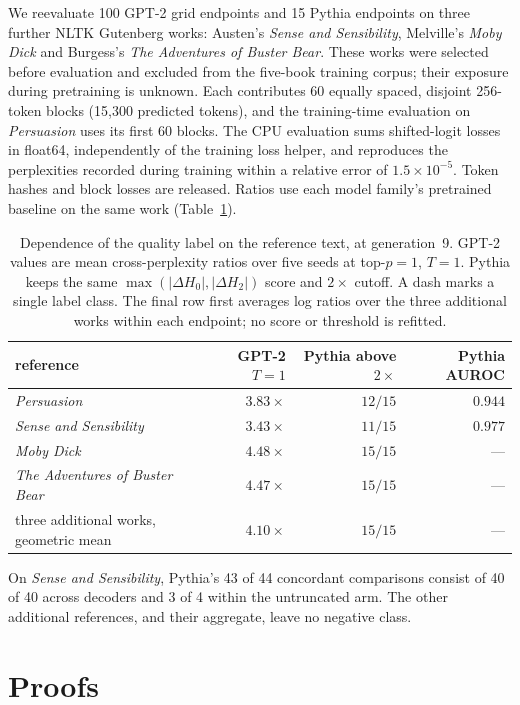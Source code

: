\documentclass[10pt]{article}
\theoremstyle{plain}
\theoremstyle{definition}
\newcommand{\Htwo}{H_2}
\newcommand{\Hz}{H_0}
\begin{document}
We reevaluate 100 GPT-2 grid endpoints and 15 Pythia endpoints on three further NLTK Gutenberg
works: Austen's \emph{Sense and Sensibility}, Melville's \emph{Moby Dick} and Burgess's \emph{The
Adventures of Buster Bear}. These works were selected before evaluation and excluded from the
five-book training corpus; their exposure during pretraining is unknown. Each contributes 60
equally spaced, disjoint 256-token blocks (15,300 predicted tokens), and the training-time
evaluation on \emph{Persuasion} uses its first 60 blocks. The CPU evaluation sums shifted-logit
losses in float64, independently of the training loss helper, and reproduces the perplexities
recorded during training within a relative error of $1.5\times10^{-5}$. Token hashes and block losses are
released. Ratios use each model family's pretrained baseline on the same work
(Table~\ref{tab:multiwork}).

\begin{table}[ht]
\centering\small
\caption{Dependence of the quality label on the reference text, at generation~9. GPT-2 values
are mean cross-perplexity ratios over five seeds at top-$p=1$, $T=1$. Pythia keeps the same
$\max(|\Delta\Hz|,|\Delta\Htwo|)$ score and $2\times$ cutoff. A dash marks a single label class.
The final row first averages log ratios over the three additional works within each endpoint; no
score or threshold is refitted.}
\label{tab:multiwork}
\begin{tabular}{lrrr}
\toprule
reference & GPT-2 $T=1$ & Pythia above $2\times$ & Pythia AUROC \\
\midrule
\emph{Persuasion} & $3.83\times$ & $12/15$ & $0.944$ \\
\emph{Sense and Sensibility} & $3.43\times$ & $11/15$ & $0.977$ \\
\emph{Moby Dick} & $4.48\times$ & $15/15$ & --- \\
\emph{The Adventures of Buster Bear} & $4.47\times$ & $15/15$ & --- \\
three additional works, geometric mean & $4.10\times$ & $15/15$ & --- \\
\bottomrule
\end{tabular}
\end{table}

On \emph{Sense and Sensibility}, Pythia's 43 of 44 concordant comparisons consist of 40 of 40
across decoders and 3 of 4 within the untruncated arm. The other additional references, and their
aggregate, leave no negative class.

\section{Proofs}
\label{app:proofs}
\end{document}
